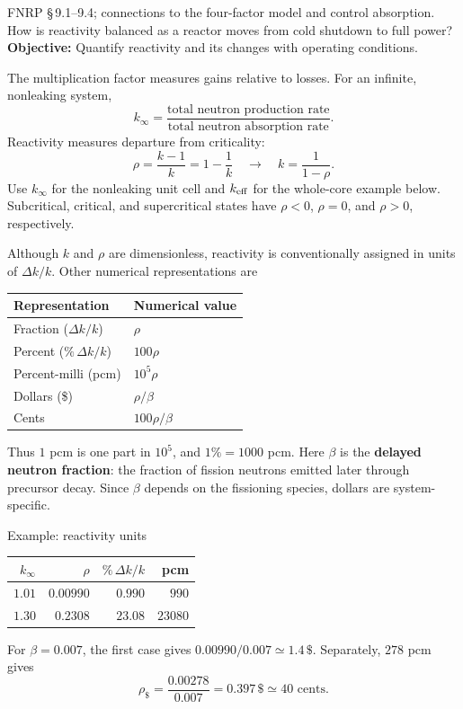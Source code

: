 \documentclass[compact]{ne630handout}
\begin{document}
\NEbody
{}
 {FNRP \S\,9.1--9.4; connections to the four-factor model and control absorption.}
 {How is reactivity balanced as a reactor moves from cold shutdown to full power?}
\textbf{Objective:} Quantify reactivity and its changes with operating conditions.

\colstart
{}
The multiplication factor measures gains relative to losses. For an infinite, nonleaking system,
$$
 k_\infty=\frac{\text{total neutron production rate}}
 {\text{total neutron absorption rate}}.
$$
Reactivity measures departure from criticality:
$$
 \boxed{\rho=\frac{k-1}{k}=1-\frac{1}{k} \quad \longrightarrow \quad k=\frac{1}{1-\rho}.}
$$
Use $k_\infty$ for the nonleaking unit cell and $k_{\rm eff}$ for the whole-core example below. Subcritical, critical, and supercritical states have $\rho<0$, $\rho=0$, and $\rho>0$, respectively.

Although $k$ and $\rho$ are dimensionless, reactivity is conventionally assigned in units of $\Delta k/k$. Other numerical representations are
\begin{center}
\renewcommand{\arraystretch}{1.08}
\begin{tabular}{@{}ll@{}}
\toprule
Representation & Numerical value\\
\midrule
Fraction ($\Delta k/k$) & $\rho$\\
Percent ($\%\,\Delta k/k$) & $100\rho$\\
Percent-milli (pcm) & $10^5\rho$\\
Dollars (\$) & $\rho/\beta$\\
Cents & $100\rho/\beta$\\
\bottomrule
\end{tabular}
\end{center}
Thus $1$ pcm is one part in $10^5$, and $1\%=1000$ pcm. Here $\beta$ is the \textbf{delayed neutron fraction}: the fraction of fission neutrons emitted later through precursor decay. Since $\beta$ depends on the fissioning species, dollars are system-specific.

\begin{KeyBox}{Example: reactivity units}
\centering
\renewcommand{\arraystretch}{1.08}
\begin{tabular}{@{}rrrr@{}}
\toprule
$k_\infty$ & $\rho$ & $\%\,\Delta k/k$ & pcm\\
\midrule
$1.01$ & $0.00990$ & $0.990$ & $990$\\
$1.30$ & $0.2308$ & $23.08$ & $23080$\\
\bottomrule
\end{tabular}\par
\RaggedRight
For $\beta=0.007$, the first case gives $0.00990/0.007\simeq1.4\,\$$. Separately, $278$ pcm gives
$$\rho_{\$}=\frac{0.00278}{0.007}=0.397\,\$\simeq40\text{ cents}.$$
\end{KeyBox}
\end{document}

